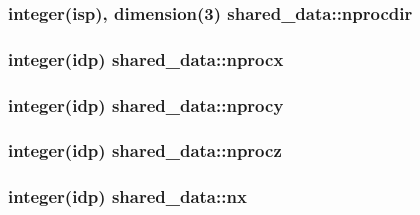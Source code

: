 \subsubsection[{\texorpdfstring{nprocdir}{nprocdir}}]{\setlength{\rightskip}{0pt plus 5cm}integer(isp), dimension(3) shared\+\_\+data\+::nprocdir}\hypertarget{namespaceshared__data_a73f0e719e591e27a33b1e75d95ae31cb}{}\label{namespaceshared__data_a73f0e719e591e27a33b1e75d95ae31cb}
\subsubsection[{\texorpdfstring{nprocx}{nprocx}}]{\setlength{\rightskip}{0pt plus 5cm}integer(idp) shared\+\_\+data\+::nprocx}\hypertarget{namespaceshared__data_a83d7bbce1bbb5ff87a019c7ee7fa6f81}{}\label{namespaceshared__data_a83d7bbce1bbb5ff87a019c7ee7fa6f81}
\subsubsection[{\texorpdfstring{nprocy}{nprocy}}]{\setlength{\rightskip}{0pt plus 5cm}integer(idp) shared\+\_\+data\+::nprocy}\hypertarget{namespaceshared__data_a86495fbffc6b53172334c5fe8109fed8}{}\label{namespaceshared__data_a86495fbffc6b53172334c5fe8109fed8}
\subsubsection[{\texorpdfstring{nprocz}{nprocz}}]{\setlength{\rightskip}{0pt plus 5cm}integer(idp) shared\+\_\+data\+::nprocz}\hypertarget{namespaceshared__data_ab80ca6154fd93118dc6455ec5e12de43}{}\label{namespaceshared__data_ab80ca6154fd93118dc6455ec5e12de43}
\subsubsection[{\texorpdfstring{nx}{nx}}]{\setlength{\rightskip}{0pt plus 5cm}integer(idp) shared\+\_\+data\+::nx}\hypertarget{namespaceshared__data_ac04f4ac48d632f67068e3623d39b847d}{}\label{namespaceshared__data_ac04f4ac48d632f67068e3623d39b847d}


